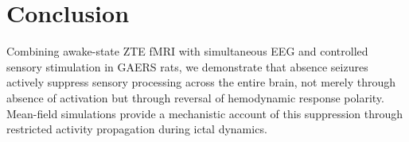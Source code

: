 \documentclass[11pt]{article}
\begin{document}
\section{Conclusion}

Combining awake-state ZTE fMRI with simultaneous EEG and controlled sensory stimulation in GAERS rats, we demonstrate that absence seizures actively suppress sensory processing across the entire brain, not merely through absence of activation but through reversal of hemodynamic response polarity. Mean-field simulations provide a mechanistic account of this suppression through restricted activity propagation during ictal dynamics.



\end{document}
